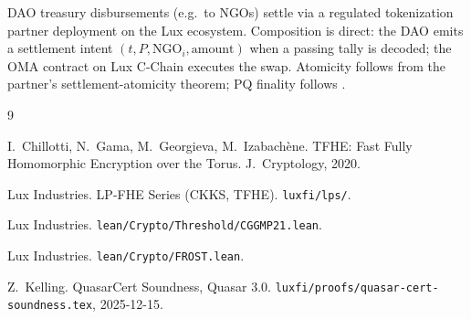 \documentclass[11pt]{article}
\begin{document}
DAO treasury disbursements (e.g.\ to NGOs) settle via a regulated
tokenization partner deployment on the Lux ecosystem. Composition is
direct: the DAO emits a settlement intent
$(t, P, \mathrm{NGO}_i, \mathrm{amount})$ when a passing tally is decoded;
the OMA contract on Lux C-Chain executes the swap. Atomicity follows
from the partner's settlement-atomicity theorem; PQ finality follows
\cite[Theorem 7.7]{quasar-cert}.

\begin{thebibliography}{9}

I.~Chillotti, N.~Gama, M.~Georgieva, M.~Izabach\`ene.
\newblock TFHE: Fast Fully Homomorphic Encryption over the Torus.
\newblock J.~Cryptology, 2020.

Lux Industries.
\newblock LP-FHE Series (CKKS, TFHE).
\newblock \texttt{luxfi/lps/}.

Lux Industries.
\newblock \texttt{lean/Crypto/Threshold/CGGMP21.lean}.

Lux Industries.
\newblock \texttt{lean/Crypto/FROST.lean}.

Z.~Kelling.
\newblock QuasarCert Soundness, Quasar 3.0.
\newblock \texttt{luxfi/proofs/quasar-cert-soundness.tex}, 2025-12-15.

\end{thebibliography}
\end{document}
